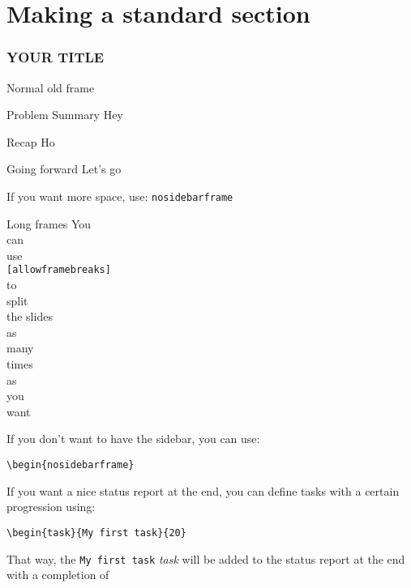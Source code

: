 

\section{Making a standard section}

\begin{frame}
    \frametitle{YOUR TITLE}
    Normal old frame
\end{frame}

\begin{frame}
    \begin{block}{Problem Summary}
        Hey
    \end{block}


    \begin{exampleblock}{Recap}
        Ho
    \end{exampleblock}

    \begin{alertblock}{Going forward}
        Let's go
    \end{alertblock}

\end{frame}


\begin{nosidebarframe}
    \centering
    If you want more space, use: \texttt{nosidebarframe}
\end{nosidebarframe}


\begin{frame}[allowframebreaks]{Long frames}
    You\\ can\\ use\\ \texttt{[allowframebreaks]}\\
    \framebreak
    to\\ split\\ the slides\\
    \framebreak
    as\\ many\\ times\\ as\\ you\\ want\\
\end{frame}


\begin{frame}[containsverbatim]

    If you don't want to have the sidebar, you can use:

    \verb|\begin{nosidebarframe}|

    If you want a nice status report at the end, you can define tasks with a certain progression using:

    \verb|\begin{task}{My first task}{20}|

    That way, the \texttt{My first task} \textit{task} will be added to the status report at the end with a completion of 

\end{frame}


